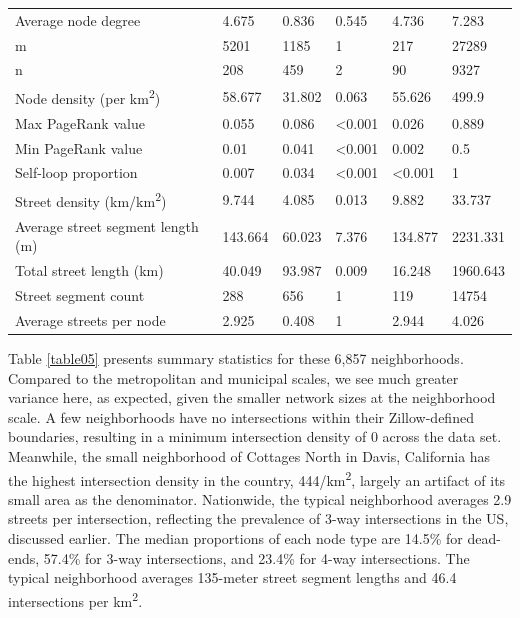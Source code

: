 \documentclass[Afour,sageh,times]{sagej}
\begin{document}
\begin{table}
\begin{tabular}{llllll}
	Average node degree                         & 4.675   & 0.836   & 0.545          & 4.736          & 7.283    \\
	m                                           & 5201    & 1185    & 1              & 217            & 27289    \\
	n                                           & 208     & 459     & 2              & 90             & 9327     \\
	Node density (per km\textsuperscript{2})                      & 58.677  & 31.802  & 0.063          & 55.626         & 499.9    \\
	Max PageRank value                          & 0.055   & 0.086   & \textless0.001 & 0.026          & 0.889    \\
	Min PageRank value                          & 0.01    & 0.041   & \textless0.001 & 0.002          & 0.5      \\
	Self-loop proportion                        & 0.007   & 0.034   & \textless0.001 & \textless0.001 & 1        \\
	Street density (km/km\textsuperscript{2})                     & 9.744   & 4.085   & 0.013          & 9.882          & 33.737   \\
	Average street segment length (m)           & 143.664 & 60.023  & 7.376          & 134.877        & 2231.331 \\
	Total street length (km)                    & 40.049  & 93.987  & 0.009          & 16.248         & 1960.643 \\
	Street segment count                        & 288     & 656     & 1              & 119            & 14754    \\
	Average streets per node                    & 2.925   & 0.408   & 1              & 2.944          & 4.026    \\
	\bottomrule
\end{tabular}
\end{table}

Table \ref{table05} presents summary statistics for these 6,857 neighborhoods. Compared to the metropolitan and municipal scales, we see much greater variance here, as expected, given the smaller network sizes at the neighborhood scale. A few neighborhoods have no intersections within their Zillow-defined boundaries, resulting in a minimum intersection density of 0 across the data set. Meanwhile, the small neighborhood of Cottages North in Davis, California has the highest intersection density in the country, 444/km\textsuperscript{2}, largely an artifact of its small area as the denominator. Nationwide, the typical neighborhood averages 2.9 streets per intersection, reflecting the prevalence of 3-way intersections in the US, discussed earlier. The median proportions of each node type are 14.5\% for dead-ends, 57.4\% for 3-way intersections, and 23.4\% for 4-way intersections. The typical neighborhood averages 135-meter street segment lengths and 46.4 intersections per km\textsuperscript{2}.
\end{document}
